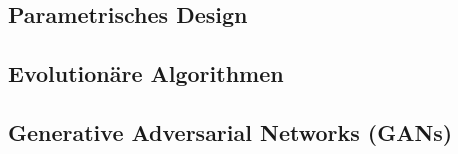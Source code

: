 \subsection*{Parametrisches Design}

\subsection*{Evolutionäre Algorithmen}

\subsection*{Generative Adversarial Networks (GANs)}

